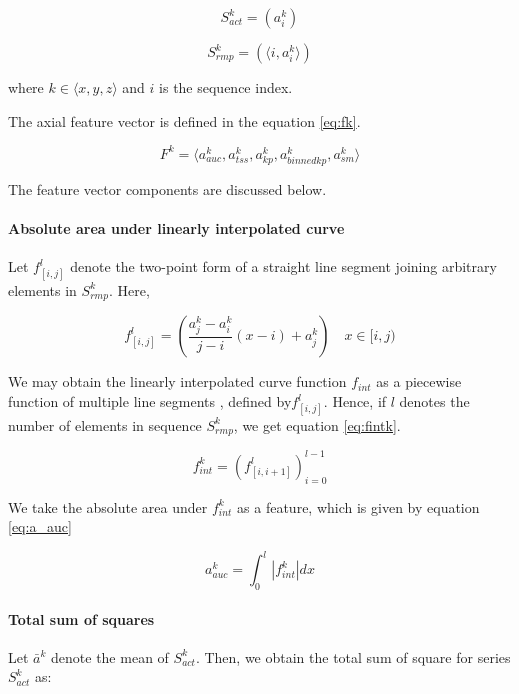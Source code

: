 \documentclass[
10pt,           %
a4paper,        %
oneside,        %
headinclude,footinclude, %
]{scrartcl}
\begin{document}
\begin{equation} \label{eq:skact}
S^k_{act}=(a^k_i)
\end{equation}


\begin{equation} \label{eq:skrmp}
S^k_{rmp}=(\langle i, a^k_i \rangle)
\end{equation}


where $k\in\langle x, y, z \rangle $ and $i$ is the sequence index.

The axial feature vector is defined in the equation \ref{eq:fk}.

\begin{equation} \label{eq:fk}
F^k = \langle a_{auc}^k, a_{tss}^k, a_{kp}^k, a_{binnedkp}^k, a_{sm}^k \rangle
\end{equation}


The feature vector components are discussed below.

\paragraph{Absolute area under linearly interpolated curve}

Let $f^l_{[i,j]}$ denote the two-point form of a straight line segment joining arbitrary elements in $S^k_{rmp}$. Here,

\begin{equation} \label{eq:fl_ij}
f^l_{[i,j]}=(\frac{a^k_j-a^k_i}{j-i}(x-i)+a^k_j) \quad x \in [i, j)
\end{equation}


We may obtain the linearly interpolated curve function $f_{int}$ as a piecewise function of multiple line segments \cite{Bradie} , defined by$f^l_{[i,j]}$. Hence, if $l$ denotes the number of elements in sequence $S^k_{rmp}$, we get equation \ref{eq:fintk}.

\begin{equation} \label{eq:fintk}
f_{int}^k = (f^l_{[i,i+1]})_{i=0}^{l-1}
\end{equation}


We take the absolute area under $f_{int}^k$ as a feature, which is given by equation \ref{eq:a_auc}

\begin{equation} \label{eq:a_auc}
a_{auc}^k=\int_0^l |f_{int}^k| dx
\end{equation}


\paragraph{Total sum of squares}
Let $\bar{a}^k$ denote the mean of $S^k_{act}$. Then, we obtain the total sum of square for series $S^k_{act}$ as:
\end{document}
